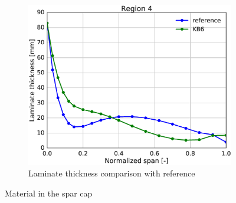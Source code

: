 \begin{figure}[tph]
\begin{subfigure}{\textwidth}
\centering
\includegraphics[width=0.50\linewidth]{figures/KB6_final/KB6_r04_thickness.eps}
\caption{Laminate thickness comparison with reference}
\label{subfig:KB6_thick_r04}
\end{subfigure}
\caption{ Material in the spar cap}
\label{fig:KB6_mat_r04}
\end{figure}

